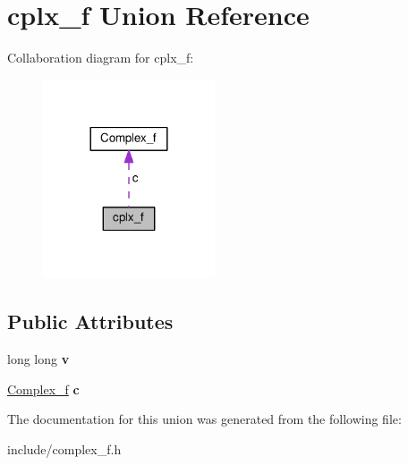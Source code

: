 \hypertarget{unioncplx__f}{}\section{cplx\+\_\+f Union Reference}
\label{unioncplx__f}


Collaboration diagram for cplx\+\_\+f\+:
\nopagebreak
\begin{figure}[H]
\begin{center}
\leavevmode
\includegraphics[width=144pt]{unioncplx__f__coll__graph}
\end{center}
\end{figure}
\subsection*{Public Attributes}
\begin{DoxyCompactItemize}
\item 
long long {\bfseries v}\hypertarget{unioncplx__f_a8200d9b6e86b7c21e80a84948af5b29f}{}\label{unioncplx__f_a8200d9b6e86b7c21e80a84948af5b29f}

\item 
\hyperlink{structComplex__f}{Complex\+\_\+f} {\bfseries c}\hypertarget{unioncplx__f_a32e7bfd6074b9f21cf0dc4e6e45b3c38}{}\label{unioncplx__f_a32e7bfd6074b9f21cf0dc4e6e45b3c38}

\end{DoxyCompactItemize}


The documentation for this union was generated from the following file\+:\begin{DoxyCompactItemize}
\item 
include/complex\+\_\+f.\+h\end{DoxyCompactItemize}
